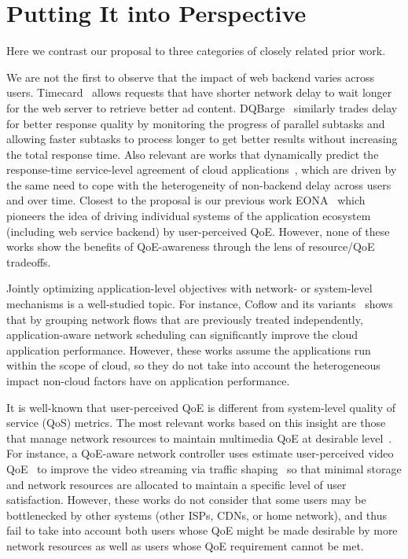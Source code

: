 \section{Putting It into Perspective}
Here we contrast our proposal to three categories of closely related prior work.

We are not the first to observe that the impact of web backend varies across users. 
Timecard~\cite{timecard} allows requests that have shorter network delay to wait longer for the web server to retrieve better ad content. 
DQBarge~\cite{dqbarge} similarly trades delay for better response quality by monitoring the progress of parallel subtasks and allowing faster subtasks to process longer to get better results without increasing the total response time.
Also relevant are works that dynamically predict the response-time service-level agreement of cloud applications~\cite{jayathilaka2015response}, which are driven by the same need to cope with the heterogeneity of non-backend delay across users and over time.
Closest to the proposal is our previous work EONA~\cite{eona} which pioneers the idea of driving individual systems of the application ecosystem (including web service backend) by user-perceived QoE.
However, none of these works show the benefits of QoE-awareness through the lens of resource/QoE tradeoffs. 

Jointly optimizing application-level objectives with network- or system-level mechanisms is a well-studied topic. 
For instance, Coflow and its variants~\cite{coflow,chowdhury2015efficient} shows that by grouping network flows that are previously treated independently, application-aware network scheduling can significantly improve the cloud application performance.
However, these works assume the applications run within the scope of cloud, so they do not take into account the heterogeneous impact non-cloud factors have on application performance.

It is well-known that user-perceived QoE is different from system-level quality of service (QoS) metrics. 
The most relevant works based on this insight are those that manage network resources to maintain multimedia QoE at desirable level~\cite{barakovic2013survey,hobfeld2012challenges,seufert2015survey}. 
For instance, a QoE-aware network controller uses estimate user-perceived video QoE~\cite{huysegems2012session} to improve the video streaming via traffic shaping~\cite{petrangeli2015network} so that minimal storage and network resources are allocated to maintain a specific level of user satisfaction.
However, these works do not consider that some users may be bottlenecked by other systems (other ISPs, CDNs, or home network), and thus fail to take into account both users whose QoE might be made desirable by more network resources as well as users whose QoE requirement cannot be met.


